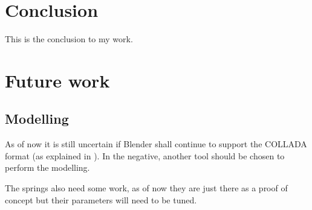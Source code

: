 \section{Conclusion}
This is the conclusion to my work.

\section{Future work}
\subsection{Modelling}
As of now it is still uncertain if Blender shall continue to support the COLLADA format (as explained in \cite{blender_roadmap}). In the negative, another tool should be chosen to perform the modelling.

The springs also need some work, as of now they are just there as a proof of concept but their parameters will need to be tuned.